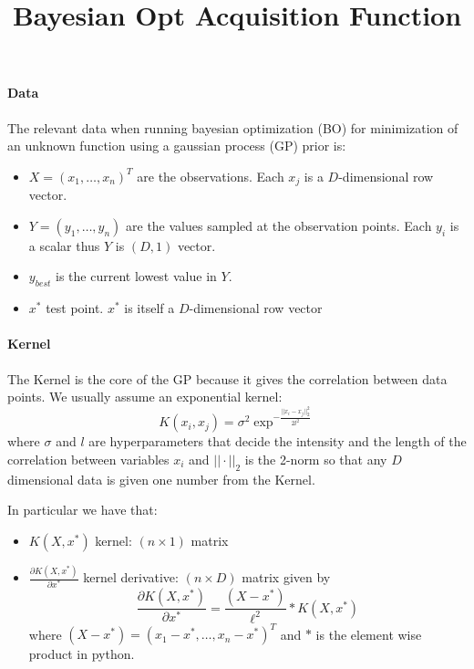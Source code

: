 \documentclass[11pt, oneside]{article}   	%
\title{Bayesian Opt Acquisition Function}
\begin{document}
\maketitle

\paragraph{Data}
The relevant data when running bayesian optimization (BO) for minimization of an unknown function using a gaussian process (GP) prior is:
\begin{itemize}
\item $X = (x_1, \dots, x_n)^T$ are the observations. Each $x_j$ is a $D$-dimensional row vector.
\item $Y = (y_1, \dots, y_n)$ are the values sampled at the observation points. Each $y_i$ is a scalar thus $Y$ is $(D, 1)$ vector. 
\item $y_{best}$ is the current lowest value in $Y$.
\item $x^*$ test point. $x^*$ is itself a $D$-dimensional row vector
\end{itemize}

\paragraph{Kernel}
The Kernel is the core of the GP because it gives the correlation between data points. We usually assume an exponential kernel:
$$ K(x_i, x_j) = \sigma^2 \exp^{-\frac{||x_i - x_j||_2^2}{2l^2}} $$
where $\sigma$ and $l$ are hyperparameters that decide the intensity and the length of the correlation between variables $x_i$ and $|| \cdot ||_2$ is the 2-norm so that any $D$ dimensional data is given one number from the Kernel.

In particular we have that:
\begin{itemize}
\item $K(X, x^*)$ kernel: $(n \times 1)$ matrix
\item $\frac{\partial K(X, x^*)}{\partial x^*}$ kernel derivative: $(n \times D)$ matrix given by
\begin{equation}
\frac{\partial K(X, x^*)}{\partial x^*} = \frac{(X - x^*)}{\ell^2} * K(X, x^*)
\end{equation}
where $(X - x^*) = (x_1 - x^*, \dots, x_n - x^*)^T$ and $*$ is the element wise product in python.
\end{itemize}
\end{document}
